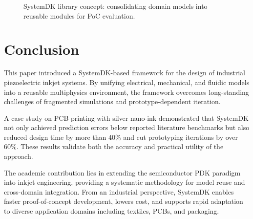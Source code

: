 \documentclass[conference]{IEEEtran}
\begin{document}
\begin{figure}[t]
\centering
{}
\caption{SystemDK library concept: consolidating domain models into reusable modules for PoC evaluation.}
\label{fig:systemdk_library}
\end{figure}

\section{Conclusion}
This paper introduced a SystemDK-based framework for the design of industrial piezoelectric inkjet systems.  
By unifying electrical, mechanical, and fluidic models into a reusable multiphysics environment, the framework overcomes long-standing challenges of fragmented simulations and prototype-dependent iteration.  

A case study on PCB printing with silver nano-ink demonstrated that SystemDK not only achieved prediction errors below reported literature benchmarks but also reduced design time by more than 40\% and cut prototyping iterations by over 60\%.  
These results validate both the accuracy and practical utility of the approach.  

The academic contribution lies in extending the semiconductor PDK paradigm into inkjet engineering, providing a systematic methodology for model reuse and cross-domain integration.  
From an industrial perspective, SystemDK enables faster proof-of-concept development, lowers cost, and supports rapid adaptation to diverse application domains including textiles, PCBs, and packaging.  
\end{document}
